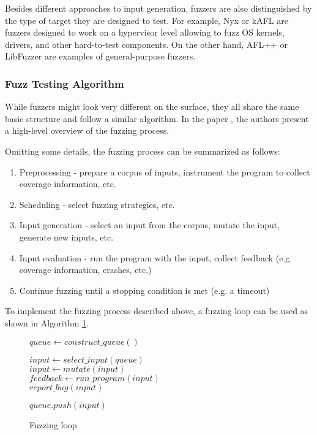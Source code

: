 Besides different approaches to input generation, fuzzers are also distinguished by the type of target they are designed to test. For example, Nyx \cite{nyx-hypervisor-fuzzer-usenix21} or kAFL \cite{kafl-usenix17} are fuzzers designed to work on a hypervisor level allowing to fuzz OS kernels, drivers, and other hard-to-test components. On the other hand, AFL++ or LibFuzzer are examples of general-purpose fuzzers.

\subsubsection{Fuzz Testing Algorithm}

While fuzzers might look very different on the surface, they all share the same basic structure and follow a similar algorithm. In the paper \cite{the-art-science-and-engineering-of-fuzzing-a-survey}, the authors present a high-level overview of the fuzzing process.

Omitting some details, the fuzzing process can be summarized as follows:

\begin{enumerate}
	\item Preprocessing - prepare a corpus of inputs, instrument the program to collect coverage information, etc.
	\item Scheduling - select fuzzing strategies, etc.
	\item Input generation - select an input from the corpus, mutate the input, generate new inputs, etc.
	\item Input evaluation - run the program with the input, collect feedback (e.g. coverage information, crashes, etc.)
	\item Continue fuzzing until a stopping condition is met (e.g. a timeout)
\end{enumerate}

To implement the fuzzing process described above, a fuzzing loop can be used as shown in Algorithm \ref{alg:fuzzing-loop}.

\begin{figure}[ht]
	\centering
	\begin{minipage}{.7\linewidth}
		\begin{algorithm}[H]
			\caption{Fuzzing loop}
			\label{alg:fuzzing-loop}
			$queue \gets construct\_queue()$ \\
			 {
				$input \gets select\_input(queue)$ \\
				$input \gets mutate(input)$ \\
				$feedback \gets run\_program(input)$ \\
				 {
					$report\_bug(input)$ \\
				}

				 {
					$queue.push(input)$ \\
				}
			}
		\end{algorithm}
	\end{minipage}
\end{figure}


